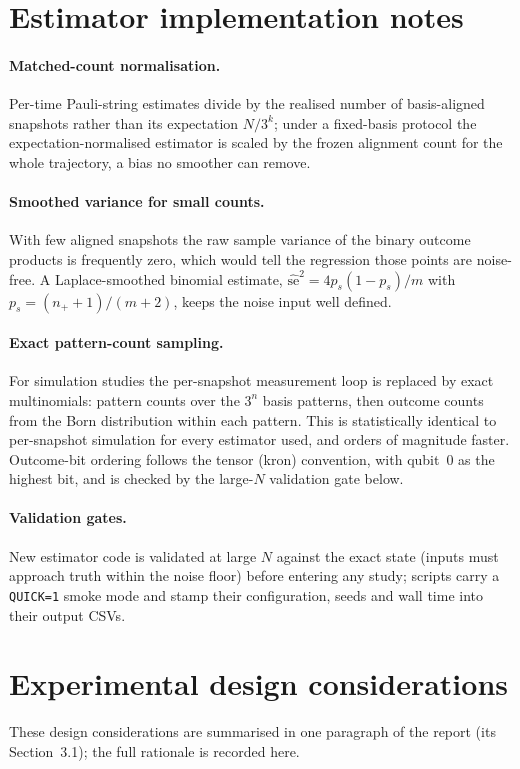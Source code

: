 \documentclass[11pt]{article}
\begin{document}
\section{Estimator implementation notes}
\paragraph{Matched-count normalisation.} Per-time Pauli-string estimates divide by the realised number
of basis-aligned snapshots rather than its expectation $N/3^k$; under a fixed-basis protocol the
expectation-normalised estimator is scaled by the frozen alignment count for the whole trajectory, a
bias no smoother can remove.

\paragraph{Smoothed variance for small counts.} With few aligned snapshots the raw sample variance of
the binary outcome products is frequently zero, which would tell the regression those points are
noise-free. A Laplace-smoothed binomial estimate,
$\widehat{\mathrm{se}}^2 = 4p_s(1-p_s)/m$ with $p_s=(n_+ + 1)/(m+2)$,
keeps the noise input well defined.

\paragraph{Exact pattern-count sampling.} For simulation studies the per-snapshot measurement loop is
replaced by exact multinomials: pattern counts over the $3^n$ basis patterns, then outcome counts from
the Born distribution within each pattern. This is statistically identical to per-snapshot simulation
for every estimator used, and orders of magnitude faster. Outcome-bit ordering follows the tensor
(kron) convention, with qubit~0 as the highest bit, and is checked by the large-$N$ validation gate
below.

\paragraph{Validation gates.} New estimator code is validated at large $N$ against the exact state
(inputs must approach truth within the noise floor) before entering any study; scripts carry a
\texttt{QUICK=1} smoke mode and stamp their configuration, seeds and wall time into their output CSVs.


\section{Experimental design considerations}
These design considerations are summarised in one paragraph of the report (its Section~3.1); the full
rationale is recorded here.
\end{document}

